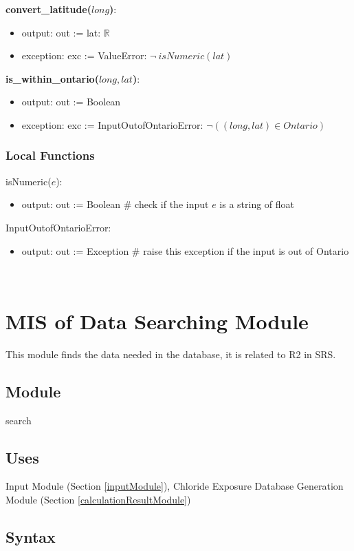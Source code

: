 \documentclass[12pt, titlepage]{article}
\begin{document}
\noindent \textbf{convert\_latitude($long$)}:
\begin{itemize}
\item output: out := lat: $\mathbb{R}$
\item exception: exc := ValueError: $\lnot ~ isNumeric(lat)$
\end{itemize}


\noindent \textbf{is\_within\_ontario($long, lat$)}:
\begin{itemize}
\item output: out := Boolean
\item exception: exc := InputOutofOntarioError: $\lnot ((long, lat) \in Ontario)$
\end{itemize}

\subsubsection{Local Functions}
\noindent isNumeric($e$):
\begin{itemize}
\item output: out := Boolean \# check if the input $e$ is a string of float 
\end{itemize}
  
\noindent InputOutofOntarioError:
\begin{itemize}
\item output: out := Exception \# raise this exception if the input is out of Ontario 
\end{itemize}
  
~\newpage

\section{MIS of Data Searching Module} \label{dataSearchingModule} 
This module finds the data needed in the database, it is related to R2 in SRS.
\subsection{Module}

search

\subsection{Uses}
 Input Module (Section \ref{inputModule}), Chloride Exposure Database Generation Module (Section \ref{calculationResultModule})



\subsection{Syntax}
\end{document}
